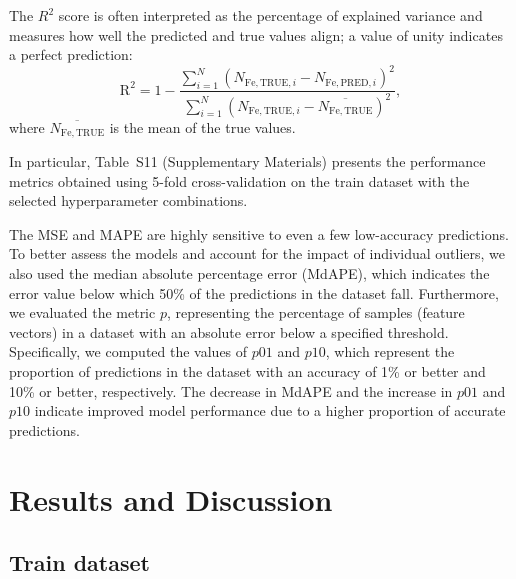 \documentclass[a4paper,fleqn]{cas-sc}
\begin{document}
The $R^2$ score is often interpreted as the percentage of explained variance
and measures how well the predicted and true values align; a value of unity indicates a perfect prediction:
\begin{equation}
\label{eq5}
    \mathrm{R}^2 = 1-\frac{\displaystyle\sum_{i=1}^{N} (N_{\mathrm{Fe,TRUE},i}-N_{\mathrm{Fe,PRED},i})^2}
    {\displaystyle\sum_{i=1}^{N} (N_{\mathrm{Fe,TRUE},i}-\overline{N_\mathrm{Fe,TRUE}})^2},
\end{equation}
where $\overline{N_\mathrm{Fe,TRUE}}$ is the mean of the true values.

In particular, Table~S11 (Supplementary Materials) presents the performance metrics obtained
using 5-fold cross-validation on the train dataset with the selected hyperparameter combinations.


The MSE and MAPE are highly sensitive to even a few low-accuracy predictions.
To better assess the models and account for the impact of individual outliers, we also used the median absolute percentage error (MdAPE),
which indicates the error value below which 50\% of the predictions in the dataset fall.
Furthermore, we evaluated the metric $p$, representing the percentage of samples (feature vectors) in a dataset with an absolute error below a specified threshold.
Specifically, we computed the values of $p01$ and $p10$,
which represent the proportion of predictions in the dataset with an accuracy of 1\%
or better and 10\% or better, respectively.
The decrease in MdAPE and the increase in $p01$ and $p10$ indicate improved model performance
due to a higher proportion of accurate predictions.



\section{Results and Discussion}

\subsection{Train dataset}
\end{document}
